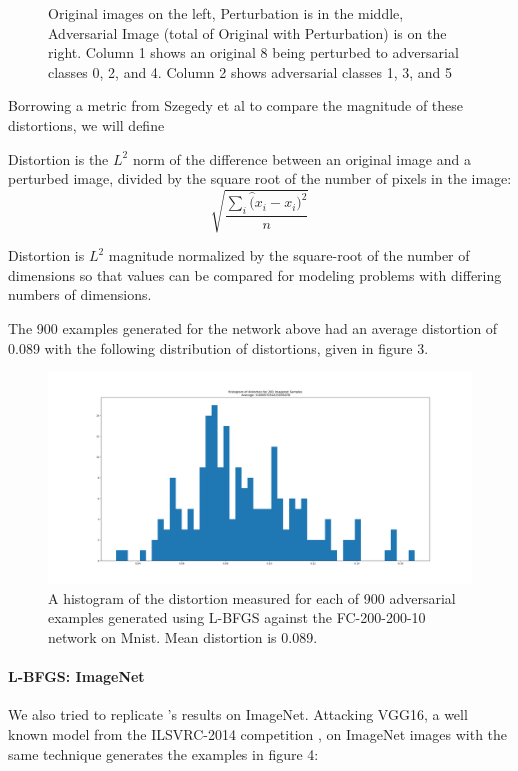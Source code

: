 \begin{figure}[H]
\caption{Original images on the left, Perturbation is in the middle, Adversarial Image (total of Original with Perturbation) is on the right. Column 1 shows an original 8 being perturbed to adversarial classes 0, 2, and 4. Column 2 shows adversarial classes 1, 3, and 5}
\end{figure}
Borrowing a metric from Szegedy et al to compare the magnitude of these distortions, we will define
\begin{definition}{Distortion is the $L^2$ norm of the difference between an original image and a perturbed image, divided by the square root of the number of pixels in the image: }
\[\sqrt{\dfrac{\sum_i \hat (x_i - x_i)^2}{n}}\]
\end{definition}
Distortion is $L^2$ magnitude normalized by the square-root of the number of dimensions so that values can be compared for modeling problems with differing numbers of dimensions. 

The 900 examples generated for the network above had an average distortion of 0.089 with the following distribution of distortions, given in figure 3.

\begin{figure}[H]
\label{lbfgsh}
\includegraphics[trim=200 80 100 100, clip, width=16cm]{c1_figures/FC200-200-10-distortion_hist.png}
\caption{A histogram of the distortion measured for each of 900 adversarial examples generated using L-BFGS against the FC-200-200-10 network on Mnist. Mean distortion is 0.089.}
\end{figure}

\paragraph{L-BFGS: ImageNet}
\label{lbfgs-s}
We also tried to replicate \cite{Szegedy2013}'s results on ImageNet. Attacking VGG16, a well known model from the ILSVRC-2014 competition \cite{simonyan2014very}, on ImageNet images with the same technique generates the examples in figure 4: 


